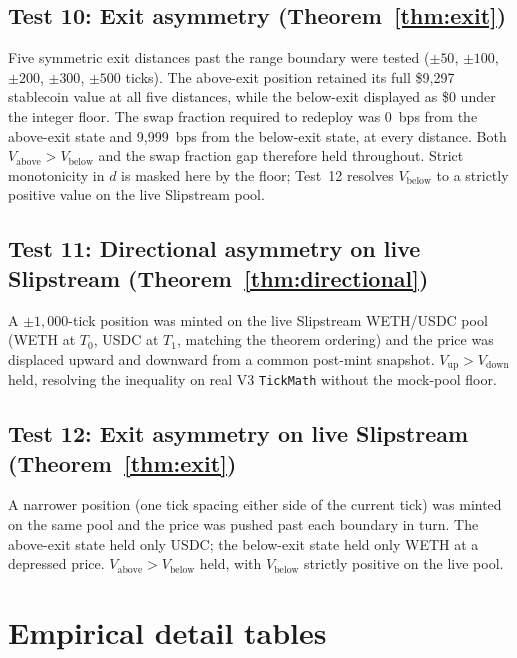 \documentclass{manuscript}
\begin{document}
\subsection{Test 10: Exit asymmetry (Theorem~\ref{thm:exit})}\label{sec:foundry-exit}

Five symmetric exit distances past the range boundary were tested ($\pm 50$, $\pm 100$, $\pm 200$, $\pm 300$, $\pm 500$ ticks). The above-exit position retained its full \$9{,}297 stablecoin value at all five distances, while the below-exit displayed as \$0 under the integer floor. The swap fraction required to redeploy was 0~bps from the above-exit state and 9{,}999~bps from the below-exit state, at every distance. Both $V_{\text{above}} > V_{\text{below}}$ and the swap fraction gap therefore held throughout. Strict monotonicity in $d$ is masked here by the floor; Test~12 resolves $V_{\text{below}}$ to a strictly positive value on the live Slipstream pool.

\subsection{Test 11: Directional asymmetry on live Slipstream (Theorem~\ref{thm:directional})}\label{sec:foundry-fork-directional}

A $\pm 1{,}000$-tick position was minted on the live Slipstream WETH/USDC pool (WETH at $T_0$, USDC at $T_1$, matching the theorem ordering) and the price was displaced upward and downward from a common post-mint snapshot. $V_{\text{up}} > V_{\text{down}}$ held, resolving the inequality on real V3 \texttt{TickMath} without the mock-pool floor.

\subsection{Test 12: Exit asymmetry on live Slipstream (Theorem~\ref{thm:exit})}\label{sec:foundry-fork-exit}

A narrower position (one tick spacing either side of the current tick) was minted on the same pool and the price was pushed past each boundary in turn. The above-exit state held only USDC; the below-exit state held only WETH at a depressed price. $V_{\text{above}} > V_{\text{below}}$ held, with $V_{\text{below}}$ strictly positive on the live pool.

\section{Empirical detail tables}\label{app:empirical}
\end{document}
